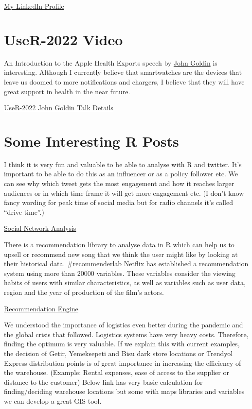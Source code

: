 \documentclass[
  letterpaper,
  DIV=11,
  numbers=noendperiod]{scrreprt}
\begin{document}
\href{https://www.linkedin.com/in/yener-alboga/}{My LinkedIn Profile}

\hypertarget{user-2022-video}{%
\section{UseR-2022 Video}\label{user-2022-video}}

An Introduction to the Apple Health Exports speech by
\href{https://www.johngoldin.com/}{John Goldin} is interesting. Although
I currently believe that smartwatches are the devices that leave us
doomed to more notifications and chargers, I believe that they will have
great support in health in the near future.

\href{https://www.rstudio.com/conference/2022/talks/introduction-to-apple-health-export/}{UseR-2022
John Goldin Talk Details}

\hypertarget{some-interesting-r-posts}{%
\section{Some Interesting R Posts}\label{some-interesting-r-posts}}

I think it is very fun and valuable to be able to analyse with R and
twitter. It's important to be able to do this as an influencer or as a
policy follower etc. We can see why which tweet gets the most engagement
and how it reaches larger audiences or in which time frame it will get
more engagement etc. (I don't know fancy wording for peak time of social
media but for radio channels it's called ``drive time''.)

\href{https://www.toptal.com/r/social-network-analysis-in-r-gephi-tutorial}{Social
Network Analysis}

There is a recommendation library to analyse data in R which can help us
to upsell or recommend new song that we think the user might like by
looking at their historical data. \#recommenderlab Netflix has
established a recommendation system using more than 20000 variables.
These variables consider the viewing habits of users with similar
characteristics, as well as variables such as user data, region and the
year of production of the film's actors.

\href{https://www.data-mania.com/blog/how-to-build-a-recommendation-engine-in-r/}{Recommendation
Engine}

We understood the importance of logistics even better during the
pandemic and the global crisis that followed. Logistics systems have
very heavy costs. Therefore, finding the optimum is very valuable. If we
explain this with current examples, the decision of Getir, Yemeksepeti
and Bisu dark store locations or Trendyol Express distribution points is
of great importance in increasing the efficiency of the warehouse.
(Example: Rental expenses, ease of access to the supplier or distance to
the customer) Below link has very basic calculation for finding/deciding
warehouse locations but some with maps libraries and variables we can
develop a great GIS tool.
\end{document}
